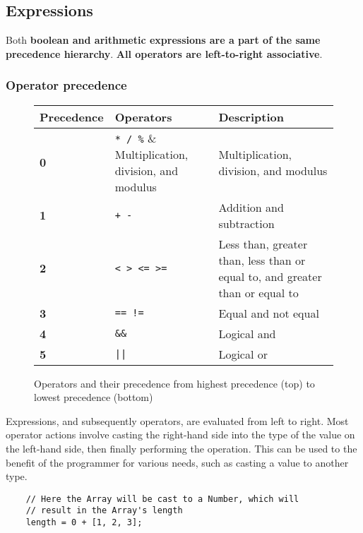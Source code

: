 \subsection{Expressions}
\label{sec:expressions}

Both \textbf{boolean and arithmetic expressions are a part of the same precedence hierarchy}. \textbf{All operators are left-to-right associative}.

\subsubsection{Operator precedence}

\begin{figure}[H]
    \begin{center}
        \begin{tabular}{| m{2cm} | m{2cm} | m{5cm} |}
            \hline
            Precedence & Operators & Description\\
            \hline
            \textbf{0} & \verb|* / %| & Multiplication, division, and modulus\\
            \hline
            \textbf{1} & \verb|+ -| & Addition and subtraction\\
            \hline
            \textbf{2} & \verb|< > <= >=| & Less than, greater than, less than or equal to, and greater than or equal to\\
            \hline
            \textbf{3} & \verb|== !=| & Equal and not equal\\
            \hline
            \textbf{4} & \verb|&&| & Logical and\\
            \hline
            \textbf{5} & \verb+||+ & Logical or\\
            \hline
        \end{tabular}
    \end{center}
    \caption{Operators and their precedence from highest precedence (top) to lowest precedence (bottom)}
\end{figure}

Expressions, and subsequently operators, are evaluated from left to right. Most operator actions involve casting the right-hand side into the type of the value on the left-hand side, then finally performing the operation. This can be used to the benefit of the programmer for various needs, such as casting a value to another type.

\begin{verbatim}
    // Here the Array will be cast to a Number, which will 
    // result in the Array's length
    length = 0 + [1, 2, 3];
\end{verbatim}

